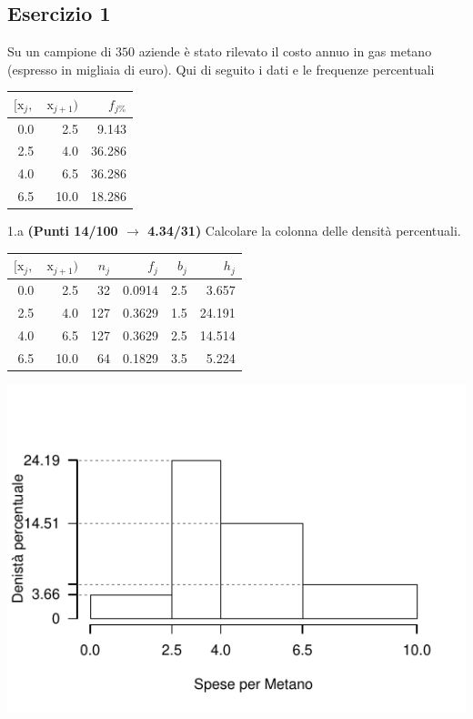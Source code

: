 \documentclass[
  11pt,
]{book}
\theoremstyle{mytheoremstyle}
\theoremstyle{mydefstyle}
\newenvironment{sol}
  {
  \begin{tcolorbox}[enhanced,breakable,arc=0.1mm,boxrule=1pt,colback=white,colframe=iblue,
  title=\bf \fontfamily{lmss}\selectfont \hspace{.5 cm} Soluzione,drop fuzzy shadow]

}{
\end{tcolorbox}
  }
\begin{document}
\subsection{Esercizio 1}\label{esercizio-1-9}

Su un campione di \(350\) aziende è stato rilevato il costo annuo in gas metano (espresso in migliaia di euro). Qui di seguito i dati e le frequenze percentuali

\begin{table}[H]
\centering
\begin{tabular}{rrr}
\toprule
$[\text{x}_j,$ & $\text{x}_{j+1})$ & $f_{j\%}$\\
\midrule
0.0 & 2.5 & 9.143\\
2.5 & 4.0 & 36.286\\
4.0 & 6.5 & 36.286\\
6.5 & 10.0 & 18.286\\
\bottomrule
\end{tabular}
\end{table}

1.a \textbf{(Punti 14/100 \(\rightarrow\) 4.34/31)} Calcolare la colonna delle densità percentuali.

\begin{sol}

\begin{table}[H]
\centering
\begin{tabular}{rrrrrr}
\toprule
$[\text{x}_j,$ & $\text{x}_{j+1})$ & $n_j$ & $f_j$ & $b_j$ & $h_j$\\
\midrule
0.0 & 2.5 & 32 & 0.0914 & 2.5 & 3.657\\
2.5 & 4.0 & 127 & 0.3629 & 1.5 & 24.191\\
4.0 & 6.5 & 127 & 0.3629 & 2.5 & 14.514\\
6.5 & 10.0 & 64 & 0.1829 & 3.5 & 5.224\\
\bottomrule
\end{tabular}
\end{table}

\begin{center}\includegraphics{Esami_passati_con_soluzioni_files/figure-latex/2021-79-1} \end{center}

\end{sol}
\end{document}
